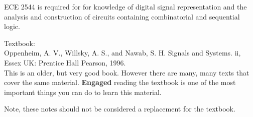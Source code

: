 ECE 2544 is required for for knowledge of digital signal representation and the analysis and construction of circuits containing combinatorial and sequential logic.

Textbook:\\
  Oppenheim, A. V., Willsky, A. S., and Nawab, S. H. Signals and Systems. ii, Essex UK: Prentice Hall Pearson, 1996.\\

  This is an older, but very good book. However there are many, many texts that cover the same material. {\bf Engaged} reading the textbook is one of the most important things you can do to learn this material.

  Note, these notes should not be considered a replacement for the textbook.


